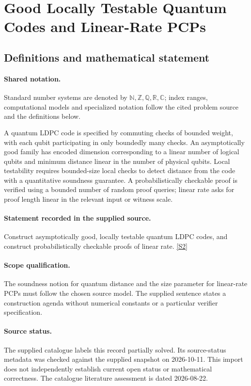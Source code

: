 \documentclass[11pt]{article}
\newcommand{\sref}[2]{\hyperlink{source:#1:#2}{[S#2]}}
\begin{document}
\section{Good Locally Testable Quantum Codes and Linear-Rate PCPs}\label{statement}

\subsection{Definitions and mathematical statement}

\paragraph{Shared notation.}Standard number systems are denoted by $\mathbb N,\mathbb Z,\mathbb Q,\mathbb R,\mathbb C$; index ranges, computational models and specialized notation follow the cited problem source and the definitions below.


A quantum LDPC code is specified by commuting checks of bounded weight, with each qubit participating in only boundedly many checks. An asymptotically good family has encoded dimension corresponding to a linear number of logical qubits and minimum distance linear in the number of physical qubits. Local testability requires bounded-size local checks to detect distance from the code with a quantitative soundness guarantee. A probabilistically checkable proof is verified using a bounded number of random proof queries; linear rate asks for proof length linear in the relevant input or witness scale.
\paragraph{Statement recorded in the supplied source.}
Construct asymptotically good, locally testable quantum LDPC codes, and construct probabilistically checkable proofs of linear rate. \sref{statement}{2}
\paragraph{Scope qualification.}
The soundness notion for quantum distance and the size parameter for linear-rate PCPs must follow the chosen source model. The supplied sentence states a construction agenda without numerical constants or a particular verifier specification.
\paragraph{Source status.}
The supplied catalogue labels this record partially solved. Its source-status metadata was checked against the supplied snapshot on 2026-10-11. This import does not independently establish current open status or mathematical correctness. The catalogue literature assessment is dated 2026-08-22.
\end{document}
